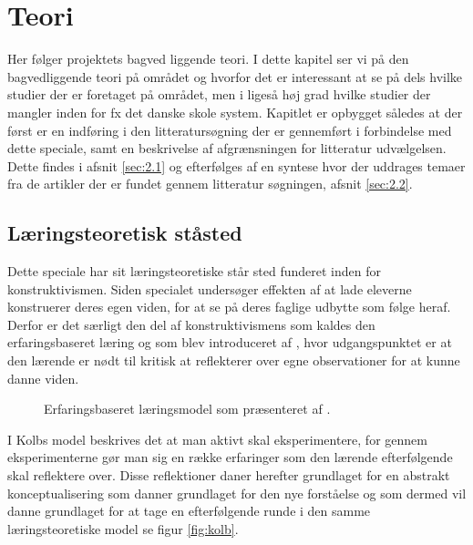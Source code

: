 \chapter{Teori}
\label{Ch:2}

Her følger projektets bagved liggende teori.
I dette kapitel ser vi på den bagvedliggende teori på området og hvorfor det er interessant at se på dels hvilke studier der er foretaget på området, men i ligeså høj grad hvilke studier der mangler inden for fx det danske skole system. Kapitlet er opbygget således at der først er en indføring i den litteratursøgning der er gennemført i forbindelse med dette speciale, samt en beskrivelse af afgrænsningen for litteratur udvælgelsen. Dette findes i afsnit \vref{sec:2.1} og efterfølges af en syntese hvor der uddrages temaer fra de artikler der er fundet gennem litteratur søgningen, afsnit \vref{sec:2.2}.

\section{Læringsteoretisk ståsted}
\label{sec:2.0}
Dette speciale har sit læringsteoretiske står sted funderet inden for konstruktivismen. Siden specialet undersøger effekten af at lade eleverne konstruerer deres egen viden, for at se på deres faglige udbytte som følge heraf. Derfor er det særligt den del af konstruktivismens som kaldes den erfaringsbaseret læring og som blev introduceret af \citet{Kolb1984}, hvor udgangspunktet er at den lærende er nødt til kritisk at reflekterer over egne observationer for at kunne danne viden. 
\begin{figure}
	\centering
	\caption{Erfaringsbaseret læringsmodel som præsenteret af \citep{Kolb1984}.}
	\label{fig:kolb}
\end{figure}

I Kolbs model beskrives det at man aktivt skal eksperimentere, for gennem eksperimenterne gør man sig en række erfaringer som den lærende efterfølgende skal reflektere over. Disse reflektioner daner herefter grundlaget for en abstrakt konceptualisering som danner grundlaget for den nye forståelse og som dermed vil danne grundlaget for at tage en efterfølgende runde i den samme læringsteoretiske model se figur \vref{fig:kolb}. 

